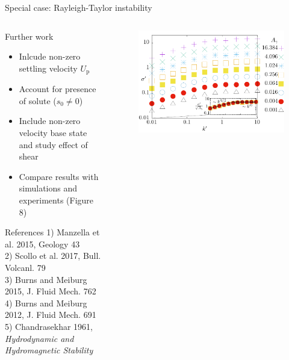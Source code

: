 \documentclass[final]{beamer} %
\begin{document}
\begin{frame}[t]
\begin{block}{Special case: Rayleigh-Taylor instability}
\begin{columns}[t]
\begin{column}{0.3\paperwidth}
        \begin{block}{Further work}
          \begin{itemize}
          \item Inlcude non-zero settling velocity $U_{\text{p}}$\\
          \item Account for presence of solute ($s_{0} \ne 0$) \\
          \item Include non-zero velocity base state and study effect of shear \\
          \item Compare results with simulations and experiments (Figure 8)\\
            
          \end{itemize}

        \end{block}

        \tiny
        \begin{exampleblock}{\scriptsize References}
          1) Manzella et al. 2015, Geology 43 \\
          2) Scollo et al. 2017, Bull. Volcanl. 79 \\
          3) Burns and Meiburg 2015, J. Fluid Mech. 762 \\
          4) Burns and Meiburg 2012, J. Fluid Mech. 691 \\
          5) Chandrasekhar 1961, \textit{Hydrodynamic and Hydromagnetic Stability} \\

        \end{exampleblock}
        
      \end{column}

      \begin{column}{0.3\paperwidth}

        \vspace{-0.5cm}

        \begin{figure}
          \includegraphics[width=0.3\paperwidth]{RT_dispersion.pdf}
        \end{figure}


\end{column}
\end{columns}
\end{block}
\end{frame}
\end{document}
